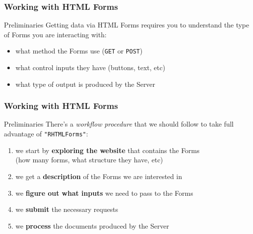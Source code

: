 \documentclass{beamer}\usepackage[]{graphicx}\usepackage[]{color}
\newcommand{\code}[1]{\texttt{#1}}
\newcommand{\low}[1]{\textcolor{lowlight}{#1}}
\begin{document}
\begin{frame}
\frametitle{Working with HTML Forms}

\begin{block}{Preliminaries}
Getting data via HTML Forms requires you to understand the type of Forms you are interacting with: 
\begin{itemize}
 \item what method the Forms use (\code{GET} or \code{POST})
 \item what control inputs they have (buttons, text, etc)
 \item what type of output is produced by the Server
\end{itemize}
\end{block}

\end{frame}


\begin{frame}
\frametitle{Working with HTML Forms}

\begin{block}{Preliminaries}
There's a \textit{workflow procedure} that we should follow to take full advantage of \code{"RHTMLForms"}: 
\begin{enumerate}
 \item we start by \textbf{exploring the website} that contains the Forms \\
 \low{(how many forms, what structure they have, etc)}
 \item we get a \textbf{description} of the Forms we are interested in
 \item we \textbf{figure out what inputs} we need to pass to the Forms
 \item we \textbf{submit} the necessary requests
 \item we \textbf{process} the documents produced by the Server
\end{enumerate}
\end{block}

\end{frame}

\end{document}
